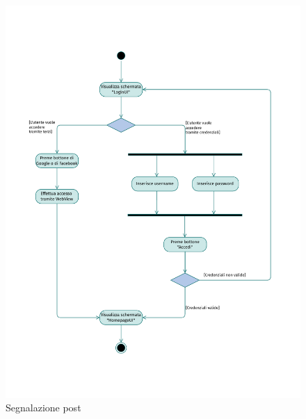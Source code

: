 \documentclass{natourDoc}
\begin{document}
\newpage
\begin{figure}[!htbp]
	\centering
	\includegraphics[width=\textwidth, page=15]{./diagrams/activity.pdf}
	\caption{Segnalazione post}
\end{figure}
\FloatBarrier

\newpage
\end{document}

